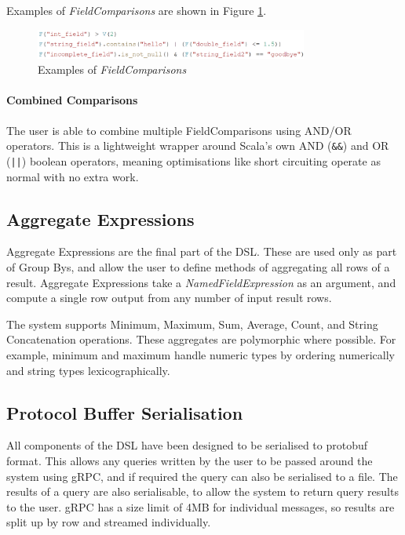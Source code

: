 Examples of \textit{FieldComparisons} are shown in Figure \ref{fig:field-comparisons-examples}.

\begin{figure}[h]
	\centering
	\includegraphics[width=0.8\textwidth]{chapters/diagrams/implementation/field-comparisons-examples}
	\caption{Examples of \textit{FieldComparisons}}
	\label{fig:field-comparisons-examples}
\end{figure}

\paragraph{Combined Comparisons}
The user is able to combine multiple FieldComparisons using AND/OR operators. This is a lightweight wrapper around Scala's own AND (\texttt{\&\&}) and OR (\texttt{||}) boolean operators, meaning optimisations like short circuiting operate as normal with no extra work.

\subsection{Aggregate Expressions}
Aggregate Expressions are the final part of the DSL. These are used only as part of Group Bys, and allow the user to define methods of aggregating all rows of a result. Aggregate Expressions take a \textit{NamedFieldExpression} as an argument, and compute a single row output from any number of input result rows.

The system supports Minimum, Maximum, Sum, Average, Count, and String Concatenation operations. These aggregates are polymorphic where possible. For example, minimum and maximum handle numeric types by ordering numerically and string types lexicographically.


\subsection{Protocol Buffer Serialisation}
All components of the DSL have been designed to be serialised to protobuf format. This allows any queries written by the user to be passed around the system using gRPC, and if required the query can also be serialised to a file. The results of a query are also serialisable, to allow the system to return query results to the user. gRPC has a size limit of 4MB for individual messages, so results are split up by row and streamed individually.

